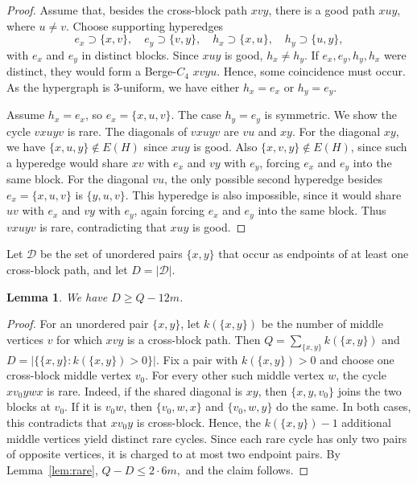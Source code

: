 \documentclass[11pt]{article}
\newtheorem{lemma}[theorem]{Lemma}
\begin{document}
\begin{proof}
Assume that, besides the cross-block path $xvy$, there is a good path $xuy$,
where $u\ne v$.  Choose supporting hyperedges
\[
e_x\supset\{x,v\},\quad e_y\supset\{v,y\},\quad
h_x\supset\{x,u\},\quad h_y\supset\{u,y\},
\]
with $e_x$ and $e_y$ in distinct blocks.  Since $xuy$ is good, $h_x\ne h_y$.
If $e_x,e_y,h_y,h_x$ were distinct, they would form a Berge-$C_4$  $xvyu$.  Hence, some coincidence must occur. As the hypergraph is $3$-uniform, we have either $h_x=e_x$ or $h_y=e_y$.


Assume \(h_x=e_x\), so \(e_x=\{x,u,v\}\). The case \(h_y=e_y\) is symmetric.
We show the cycle \(vxuyv\) is rare. 
The diagonals of \(vxuyv\) are \(vu\) and \(xy\). For the diagonal \(xy\), we have
\(\{x,u,y\}\notin E(H)\) since \(xuy\) is good. Also
\(\{x,v,y\}\notin E(H)\), since such a hyperedge would share \(xv\) with
\(e_x\) and \(vy\) with \(e_y\), forcing \(e_x\) and \(e_y\) into the same block.
For the diagonal \(vu\), the only possible second hyperedge besides
\(e_x=\{x,u,v\}\) is \(\{y,u,v\}\). This hyperedge is also impossible, since it
would share \(uv\) with \(e_x\) and \(vy\) with \(e_y\), again forcing \(e_x\)
and \(e_y\) into the same block. Thus \(vxuyv\) is rare, contradicting that \(xuy\) is good.

\end{proof}

Let $\mathcal D$ be the set of unordered pairs $\{x,y\}$ that occur as endpoints of at least one cross-block path, and let $D=|\mathcal D|$.  

\begin{lemma}\label{lem:DQ}
We have $D\ge Q-12m$.
\end{lemma}

\begin{proof}
For an unordered pair $\{x,y\}$, let $k(\{x,y\})$ be the number of middle vertices $v$ for which $xvy$ is a cross-block path. Then $Q=\sum_{\{x,y\}}k(\{x,y\})$ and $D=|\{\{x,y\}:k(\{x,y\})>0\}|$. Fix a pair with $k(\{x,y\})>0$ and choose one cross-block middle vertex $v_0$. For every other such middle vertex $w$, the cycle $xv_0ywx$ is rare. Indeed, if the shared diagonal is \(xy\), then \(\{x,y,v_0\}\) joins the two blocks at
\(v_0\). 
If it is \(v_0w\), then \(\{v_0,w,x\}\) and \(\{v_0,w,y\}\) do the
same. In both cases, this contradicts that \(xv_0y\) is cross-block.
Hence, the \(k(\{x,y\})-1\) additional middle vertices yield distinct rare cycles. Since each rare cycle has only two pairs of opposite vertices, it is charged to at most two endpoint pairs. By Lemma~\ref{lem:rare}, $Q-D\le 2\cdot 6m,$
and the claim follows.
\end{proof}
\end{document}
